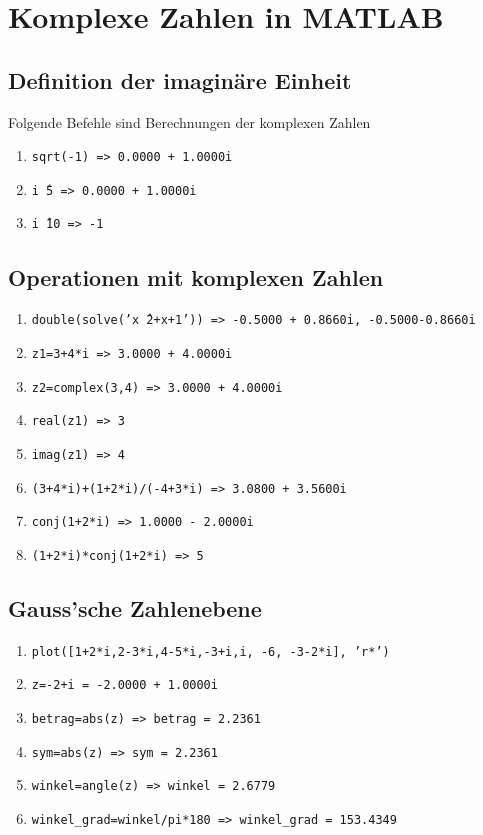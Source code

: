 \section{Komplexe Zahlen in MATLAB}
\subsection{Definition der imaginäre Einheit}
Folgende Befehle sind Berechnungen der komplexen Zahlen
\begin{enumerate}[$\texttt{>}\texttt{>}$]
\item {\color{red}\texttt{sqrt(-1) => 0.0000 + 1.0000i}}
\item {\color{red}\texttt{i\^\,5 => 0.0000 + 1.0000i}}
\item {\color{red}\texttt{i\^\,10 => -1}}
\end{enumerate}
\subsection{Operationen mit komplexen Zahlen}
\begin{enumerate}[$\texttt{>}\texttt{>}$]
\item {\color{red}\texttt{double(solve('x\^\,2+x+1')) => -0.5000 + 0.8660i, -0.5000-0.8660i}}
\item {\color{red}\texttt{z1=3+4*i => 3.0000 + 4.0000i}}
\item {\color{red}\texttt{z2=complex(3,4) => 3.0000 + 4.0000i}}
\item {\color{red}\texttt{real(z1) => 3}}
\item {\color{red}\texttt{imag(z1) => 4}}
\item {\color{red}\texttt{(3+4*i)+(1+2*i)/(-4+3*i) => 3.0800 + 3.5600i}}
\item {\color{red}\texttt{conj(1+2*i) => 1.0000 - 2.0000i}}
\item {\color{red}\texttt{(1+2*i)*conj(1+2*i) => 5}}
\end{enumerate}
\subsection{Gauss'sche Zahlenebene}
\begin{enumerate}[$\texttt{>}\texttt{>}$]
\item {\color{red}\texttt{plot([1+2*i,2-3*i,4-5*i,-3+i,i, -6, -3-2*i], 'r*')}}
\item {\color{red}\texttt{z=-2+i = -2.0000 + 1.0000i}}
\item {\color{red}\texttt{betrag=abs(z) => betrag =  2.2361}}
\item {\color{red}\texttt{sym=abs(z) => sym =  2.2361}}
\item {\color{red}\texttt{winkel=angle(z) => winkel =  2.6779}}
\item {\color{red}\texttt{winkel\_grad=winkel/pi*180 => winkel\_grad = 153.4349}}
\end{enumerate}
